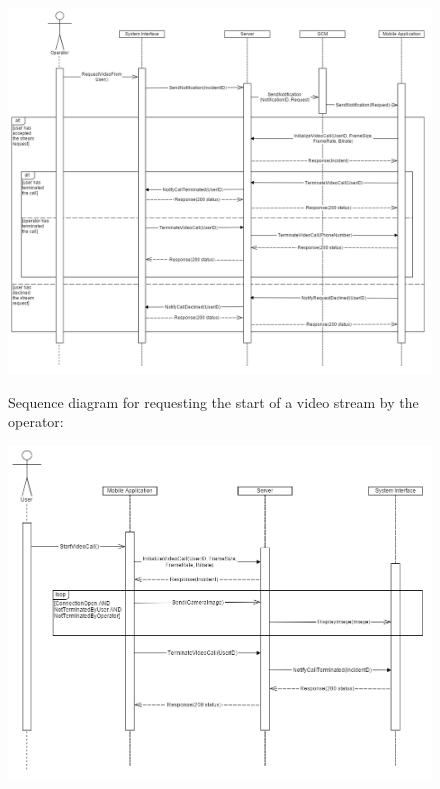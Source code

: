 \documentclass{article}
\begin{document}
	
	\begin{figure}[h]
		\centering
		\includegraphics[width=.9\textwidth]{"VideoStream/2"}

		Sequence diagram for requesting the start of a video stream by the operator:
	\end{figure} \clearpage
	
	
	\begin{figure}[h]
		\centering
		\includegraphics[width=.9\textwidth]{"VideoStream/3"}

		
	\end{figure} \clearpage
	
	
	
\end{document}
